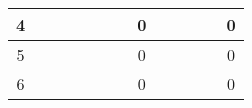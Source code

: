 \begin{adjustbox}{angle=90, captionbelow={DFMEA.}, float={table}}
\begin{tabular}{|ccccccccllllc|}
\multicolumn{1}{|c|}{4}                                         & \multicolumn{1}{l|}{}                                                                                                  & \multicolumn{1}{l|}{}                                                                                                  & \multicolumn{1}{l|}{}                                                                                                    & \multicolumn{1}{c|}{}                        & \multicolumn{1}{c|}{}                        & \multicolumn{1}{c|}{}                        & \multicolumn{1}{c|}{\cellcolor[HTML]{6AA84F}0}  & \multicolumn{1}{l|}{}                                                                                                     & \multicolumn{1}{l|}{}                        & \multicolumn{1}{l|}{}                        & \multicolumn{1}{l|}{}                        & \cellcolor[HTML]{6AA84F}0               \\ \hline
\multicolumn{1}{|c|}{5}                                         & \multicolumn{1}{l|}{}                                                                                                  & \multicolumn{1}{l|}{}                                                                                                  & \multicolumn{1}{l|}{}                                                                                                    & \multicolumn{1}{l|}{}                        & \multicolumn{1}{l|}{}                        & \multicolumn{1}{l|}{}                        & \multicolumn{1}{c|}{\cellcolor[HTML]{6AA84F}0}  & \multicolumn{1}{l|}{}                                                                                                     & \multicolumn{1}{l|}{}                        & \multicolumn{1}{l|}{}                        & \multicolumn{1}{l|}{}                        & \cellcolor[HTML]{6AA84F}0               \\ \hline
\multicolumn{1}{|c|}{6}                                         & \multicolumn{1}{l|}{}                                                                                                  & \multicolumn{1}{l|}{}                                                                                                  & \multicolumn{1}{l|}{}                                                                                                    & \multicolumn{1}{l|}{}                        & \multicolumn{1}{l|}{}                        & \multicolumn{1}{l|}{}                        & \multicolumn{1}{c|}{\cellcolor[HTML]{6AA84F}0}  & \multicolumn{1}{l|}{}                                                                                                     & \multicolumn{1}{l|}{}                        & \multicolumn{1}{l|}{}                        & \multicolumn{1}{l|}{}                        & \cellcolor[HTML]{6AA84F}0               \\ \hline
\end{tabular}


\end{adjustbox}